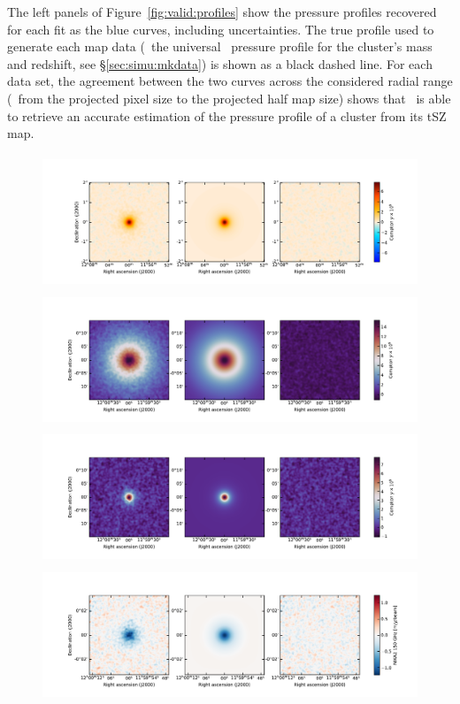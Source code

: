 The left panels of Figure~\ref{fig:valid:profiles} show the pressure profiles recovered for each fit as the blue curves, including uncertainties.
The true profile used to generate each map data (\ie\ the universal \aten\ pressure profile for the cluster's mass and redshift, see \S\ref{sec:simu:mkdata}) is shown as a black dashed line.
For each data set, the agreement between the two curves across the considered radial range (\ie\ from the projected pixel size to the projected half map size) shows that \panco\ is able to retrieve an accurate estimation of the pressure profile of a cluster from its tSZ map.

\begin{figure}[t]
    \centering
    \includegraphics[height=4cm, trim={2cm 0.7cm 1.5cm 1.5cm}, clip]{../validation/results/C1/Planck/data_model_residuals_maps.pdf}
    \includegraphics[height=4cm, trim={2cm 0.7cm 1.5cm 1.5cm}, clip]{../validation/results/C1/SPT/data_model_residuals_maps.pdf}
    \includegraphics[height=4cm, trim={2cm 0.7cm 1.5cm 1.5cm}, clip]{../validation/results/C2/SPT/data_model_residuals_maps.pdf}
    \includegraphics[height=4cm, trim={2cm 0.7cm 1.5cm 1.5cm}, clip]{../validation/results/C2/NIKA2/data_model_residuals_maps.pdf}

\end{figure}
